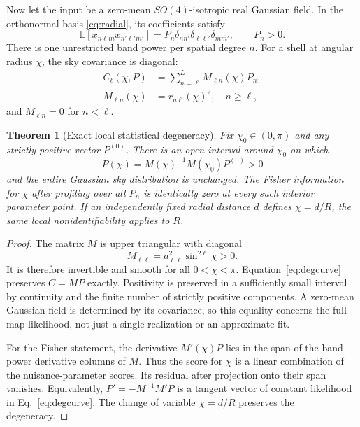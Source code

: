 \documentclass[aps,prd,reprint,amsmath,amssymb,nofootinbib,
longbibliography]{revtex4-2}
\newtheorem{theorem}{Theorem}
\begin{document}
Now let the input be a zero-mean $SO(4)$-isotropic real Gaussian field.
In the orthonormal basis \eqref{eq:radial}, its coefficients satisfy
\begin{equation}
 \mathbb E[x_{n\ell m}x_{n'\ell'm'}]
 =P_n\delta_{nn'}\delta_{\ell\ell'}\delta_{mm'},
 \qquad P_n>0.
 \label{eq:prior}
\end{equation}
There is one unrestricted band power per spatial degree $n$.
For a shell at angular radius $\chi$, the sky covariance is diagonal:
\begin{align}
 C_\ell(\chi,P)&=\sum_{n=\ell}^L M_{\ell n}(\chi)P_n,\\
 M_{\ell n}(\chi)&=r_{n\ell}(\chi)^2,\quad n\geq\ell,
 \label{eq:mixing}
\end{align}
and $M_{\ell n}=0$ for $n<\ell$.

\begin{theorem}[Exact local statistical degeneracy]
\label{thm:degeneracy}
Fix $\chi_0\in(0,\pi)$ and any strictly positive vector $P^{(0)}$.
There is an open interval around $\chi_0$ on which
\begin{equation}
 P(\chi)=M(\chi)^{-1}M(\chi_0)P^{(0)}>0
 \label{eq:degcurve}
\end{equation}
and the entire Gaussian sky distribution is unchanged.
The Fisher information for $\chi$ after profiling over all $P_n$ is
identically zero at every such interior parameter point.
If an independently fixed radial distance $d$ defines $\chi=d/R$,
the same local nonidentifiability applies to $R$.
\end{theorem}

\begin{proof}
The matrix $M$ is upper triangular with diagonal
\begin{equation}
 M_{\ell\ell}=a_{\ell\ell}^2\sin^{2\ell}\chi>0.
\end{equation}
It is therefore invertible and smooth for all $0<\chi<\pi$.
Equation~\eqref{eq:degcurve} preserves $C=MP$ exactly. Positivity is
preserved in a sufficiently small interval by continuity and the finite
number of strictly positive components. A zero-mean Gaussian field is
determined by its covariance, so this equality concerns the full map
likelihood, not just a single realization or an approximate fit.

For the Fisher statement, the derivative $M'(\chi)P$ lies in the span
of the band-power derivative columns of $M$. Thus the score for $\chi$
is a linear combination of the nuisance-parameter scores. Its residual
after projection onto their span vanishes. Equivalently,
$P'=-M^{-1}M'P$ is a tangent vector of constant likelihood in
Eq.~\eqref{eq:degcurve}. The change of variable $\chi=d/R$ preserves
the degeneracy.
\end{proof}
\end{document}
